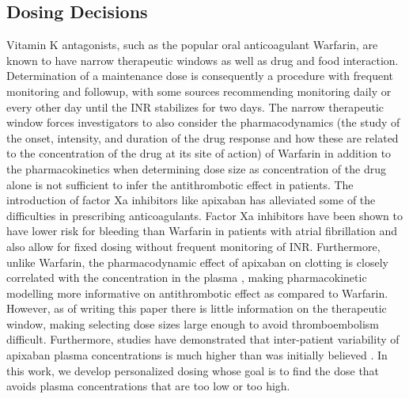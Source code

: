 \subsection*{Dosing Decisions}

Vitamin K antagonists, such as the popular oral anticoagulant Warfarin, are known to have narrow therapeutic windows as well as drug and food interaction. Determination of a maintenance dose is consequently a procedure with frequent monitoring and followup, with some sources recommending monitoring daily or every other day until the INR stabilizes for two days.  The narrow therapeutic window forces investigators to also consider the pharmacodynamics (the study of the onset, intensity, and duration of the drug response and how these are related to the concentration of the drug at its site of action) of Warfarin in addition to the pharmacokinetics when determining dose size as concentration of the drug alone is not sufficient to infer the antithrombotic effect in patients. The introduction of factor Xa inhibitors like apixaban has alleviated some of the difficulties in prescribing anticoagulants.  Factor Xa inhibitors have been shown to have lower risk for bleeding than Warfarin in patients with atrial fibrillation \cite{vinogradova2018risks} and also allow for fixed dosing without frequent monitoring of INR. Furthermore, unlike Warfarin, the pharmacodynamic effect of apixaban on clotting is closely correlated with the concentration in the plasma \cite{Byon2019-gf}, making pharmacokinetic modelling more informative on antithrombotic effect as compared to Warfarin.  However, as of writing this paper there is little information on the therapeutic window, making selecting dose sizes large enough to avoid thromboembolism difficult. Furthermore, studies have demonstrated that inter-patient variability of apixaban plasma concentrations is much higher than was initially believed \cite{gulilat2020drug}. In this work, we develop personalized dosing whose goal is to find the  dose that avoids plasma concentrations that are too low or too high.

